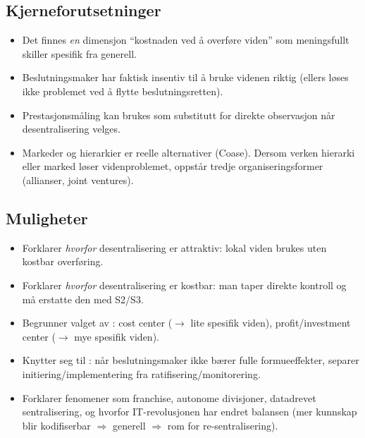 \subsection*{Kjerneforutsetninger}
\begin{itemize}
\item Det finnes \emph{en} dimensjon ``kostnaden ved å overføre viden'' som meningsfullt skiller spesifik fra generell.
\item Beslutningsmaker har faktisk insentiv til å bruke videnen riktig (ellers løses ikke problemet ved å flytte beslutningsretten).
\item Prestasjonsmåling kan brukes som substitutt for direkte observasjon når desentralisering velges.
\item Markeder og hierarkier er reelle alternativer (Coase). Dersom verken hierarki eller marked løser videnproblemet, oppstår tredje organiseringsformer (allianser, joint ventures).
\end{itemize}

\subsection*{Muligheter}
\begin{itemize}
\item Forklarer \emph{hvorfor} desentralisering er attraktiv: lokal viden brukes uten kostbar overføring.
\item Forklarer \emph{hvorfor} desentralisering er kostbar: man taper direkte kontroll og må erstatte den med S2/S3.
\item Begrunner valget av : cost center ($\to$ lite spesifik viden), profit/investment center ($\to$ mye spesifik viden).
\item Knytter seg til : når beslutningsmaker ikke bærer fulle formueeffekter, separer initiering/implementering fra ratifisering/monitorering.
\item Forklarer fenomener som franchise, autonome divisjoner, datadrevet sentralisering, og hvorfor IT-revolusjonen har endret balansen (mer kunnskap blir kodifiserbar $\Rightarrow$ generell $\Rightarrow$ rom for re-sentralisering).
\end{itemize}

